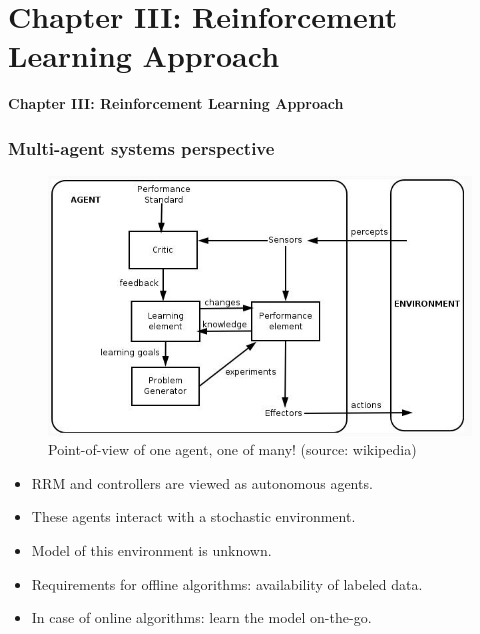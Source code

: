\documentclass{beamer}
\begin{document}
\section{Chapter III: Reinforcement Learning Approach}
\begin{frame}
\centerline{\textbf{Chapter III: Reinforcement Learning Approach}}

\end{frame}
\begin{frame}
 \frametitle{Multi-agent systems perspective}
 \begin{figure}
\centering
\includegraphics[height= .3 \textheight, width=.6\textwidth]{ncs2}
\caption{{\footnotesize Point-of-view of one agent, one of many! (source: wikipedia)}} 
\label{fig2}
\end{figure}
\vspace*{-.3in}
\begin{itemize}
 \item RRM and controllers are viewed as autonomous agents.
 \item These agents interact with a stochastic environment.
 \item Model of this environment is {\color{blue} unknown}.
 \item Requirements for offline algorithms: {\color{blue}availability of labeled data}. 
 \item In case of online algorithms: {\color{blue} learn the model on-the-go}.
\end{itemize}
\end{frame}
\end{document}
